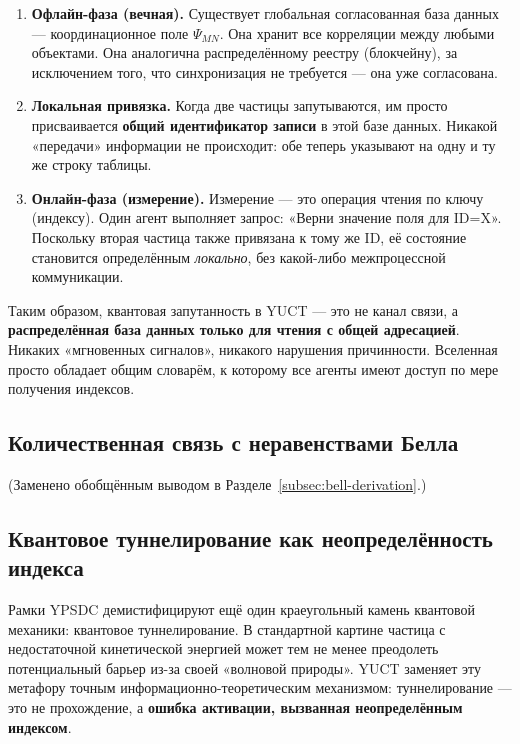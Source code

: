 \documentclass[12pt,a4paper]{article}
\theoremstyle{remark}
\begin{document}
	\begin{enumerate}[leftmargin=*]
		\item \textbf{Офлайн-фаза (вечная).} Существует глобальная согласованная база данных — координационное поле \(\Psi_{MN}\). Она хранит все корреляции между любыми объектами. Она аналогична распределённому реестру (блокчейну), за исключением того, что синхронизация не требуется — она уже согласована.
		
		\item \textbf{Локальная привязка.} Когда две частицы запутываются, им просто присваивается \textbf{общий идентификатор записи} в этой базе данных. Никакой «передачи» информации не происходит: обе теперь указывают на одну и ту же строку таблицы.
		
		\item \textbf{Онлайн-фаза (измерение).} Измерение — это операция чтения по ключу (индексу). Один агент выполняет запрос: «Верни значение поля для ID=X». Поскольку вторая частица также привязана к тому же ID, её состояние становится определённым \emph{локально}, без какой-либо межпроцессной коммуникации.
	\end{enumerate}
	
	Таким образом, квантовая запутанность в YUCT — это не канал связи, а \textbf{распределённая база данных только для чтения с общей адресацией}. Никаких «мгновенных сигналов», никакого нарушения причинности. Вселенная просто обладает общим словарём, к которому все агенты имеют доступ по мере получения индексов.
	
	\subsection{Количественная связь с неравенствами Белла}
	\label{subsec:bell-inequalities}
	
	(Заменено обобщённым выводом в Разделе~\ref{subsec:bell-derivation}.)
	
	\subsection{Квантовое туннелирование как неопределённость индекса}
	
	Рамки YPSDC демистифицируют ещё один краеугольный камень квантовой механики: квантовое туннелирование. В стандартной картине частица с недостаточной кинетической энергией может тем не менее преодолеть потенциальный барьер из-за своей «волновой природы». YUCT заменяет эту метафору точным информационно-теоретическим механизмом: туннелирование — это не прохождение, а \textbf{ошибка активации, вызванная неопределённым индексом}.
	
\end{document}
